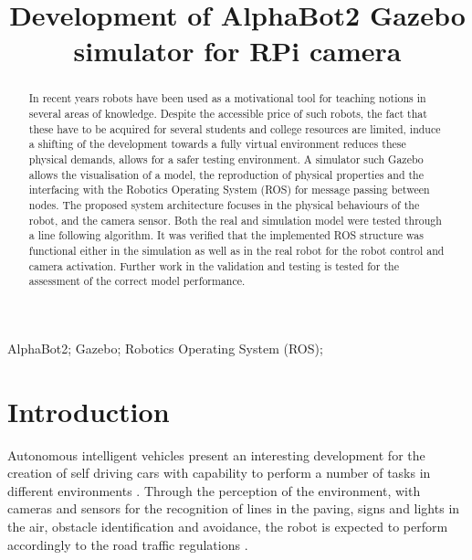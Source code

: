 \documentclass[conference]{IEEEtran}
\begin{document}
\title{Development of AlphaBot2 Gazebo simulator for RPi camera
{\footnotesize }
}

\author{
\and
{}
}

\maketitle

\begin{abstract}
In recent years robots have been used as a motivational tool for teaching notions in several areas of knowledge. Despite the accessible price of such robots, the fact that these have to be acquired for several students and college resources are limited, induce a shifting of the development towards a fully virtual environment reduces these physical demands, allows for a safer testing environment. A simulator such Gazebo allows the visualisation of a model, the reproduction of physical properties and the interfacing with the Robotics Operating System (ROS) for message passing between nodes. The proposed system architecture focuses in the physical behaviours of the robot, and the camera sensor. Both the real and simulation model were tested through a line following algorithm. It was verified that the implemented ROS structure was functional either in the simulation as well as in the real robot for the robot control and camera activation. Further work in the validation and testing is tested for the assessment of the correct model performance.
\end{abstract}

\begin{IEEEkeywords}
AlphaBot2; Gazebo; Robotics Operating System (ROS);  \end{IEEEkeywords}

\section{Introduction}
Autonomous intelligent vehicles present an interesting development for the creation of self driving cars with capability to perform a number of tasks in different environments  \cite{costaAutonomousDrivingSimulator2016a}. Through the perception of the environment, with cameras and sensors for the recognition of lines in the paving, signs and lights in the air, obstacle identification and avoidance, the robot is expected to perform accordingly to the road traffic regulations \cite{haneObstacleDetectionSelfdriving2015}. 
\end{document}
